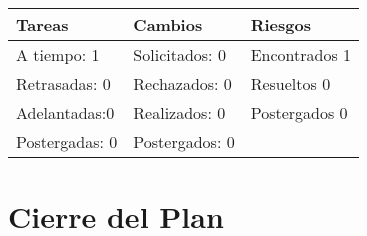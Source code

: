 \documentclass[12pt]{report}
\numberwithin{equation}{section}
\begin{document}
\begin{flushleft}
\begin{table}[H]
\begin{tabular}{|m{5cm}|m{5cm}|m{5cm}|}
\hline
\textbf{Tareas} & \textbf{Cambios} & \textbf{Riesgos}\\
\hline \hline 
A tiempo: 1 & Solicitados: 0 & Encontrados 1 \\
\hline
Retrasadas: 0 & Rechazados: 0 & Resueltos 0 \\
\hline
Adelantadas:0  & Realizados: 0  & Postergados 0 \\
\hline
Postergadas: 0 & Postergados:  0 & \\
\hline
\end{tabular}
\label{tabla: TABLA CE Resumen}
\end{table}

\end{flushleft}

\newpage





\centering \section{Cierre del Plan}\label{CE Cierre}
\end{document}
